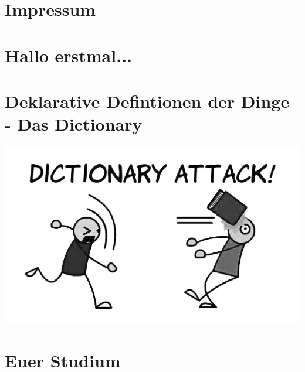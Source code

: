 \documentclass[12pt,a4paper]{scrartcl}
\begin{document}


\setcounter{tocdepth}{2} %
\tableofcontents
\newpage



\section{Impressum}

\newpage

\section{Hallo erstmal...}

\newpage

\label{glossar}
\section{Deklarative Defintionen der Dinge - Das Dictionary}

\begin{center}
	\includegraphics[scale=0.5]{comics/dictionary-attack}
\end{center}

\section{Euer Studium}
\end{document}
